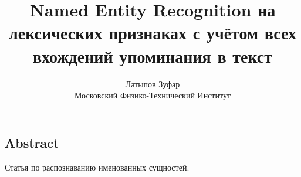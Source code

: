\documentclass[letterpaper,twocolumn,10pt]{article}
\begin{document}
\date{}

\title{\Large \textbf{Named Entity Recognition на лексических признаках с учётом всех вхождений упоминания в текст} }

\author{
{\rm Латыпов Зуфар}\\
Московский Физико-Технический Институт
}

\maketitle

\thispagestyle{empty}

\subsection*{Abstract}
Статья по распознаванию именованных сущностей.










{\footnotesize 


}
\end{document}
